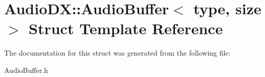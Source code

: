 \hypertarget{struct_audio_d_x_1_1_audio_buffer}{\section{Audio\-D\-X\-:\-:Audio\-Buffer$<$ type, size $>$ Struct Template Reference}
\label{struct_audio_d_x_1_1_audio_buffer}
}


The documentation for this struct was generated from the following file\-:\begin{DoxyCompactItemize}
\item 
Audio\-Buffer.\-h\end{DoxyCompactItemize}
